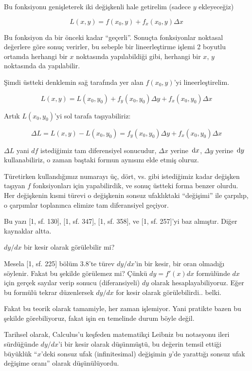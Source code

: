 \documentclass[12pt,fleqn]{article}\usepackage{../../common}
\begin{document}
Bu fonksiyonu genişleterek iki değişkenli hale getirelim (sadece $y$
ekleyeceğiz)

$$ L(x,y) = f(x_0,y) + f_x(x_0,y) \Delta x $$

Bu fonksiyon da bir önceki kadar ``geçerli''. Sonuçta fonksiyonlar
noktasal değerlere göre sonuç verirler, bu sebeple bir lineerleştirme
işlemi 2 boyutlu ortamda herhangi bir $x$ noktasında yapılabildiği
gibi, herhangi bir $x$, $y$ noktasında da yapılabilir.

Şimdi üstteki denklemin sağ tarafında yer alan $f(x_0,y)$'yi lineerleştirelim.  

$$ L(x,y) = L(x_0,y_0) + f_y(x_0,y_0) \Delta y + f_x(x_0,y_0) \Delta x $$

Artık $L(x_0,y_0)$'yi sol tarafa taşıyabiliriz:

$$ \Delta L = L(x,y) - L(x_0,y_0) = f_y(x_0,y_0) \Delta y + f_x(x_0,y_0)
\Delta x $$ 

$\Delta L$ yani $df$ istediğimiz tam diferensiyel sonucudur, $\Delta
x$ yerine $\,\mathrm{d} x$, $\Delta y$ yerine $\,\mathrm{d} y$ kullanabiliriz, o zaman baştaki
formun aynısını elde etmiş oluruz.

Türetirken kullandığımız numarayı üç, dört, vs. gibi istediğimiz kadar
değişken taşıyan $f$ fonksiyonları için yapabilirdik, ve sonuç üstteki
forma benzer olurdu. Her değişkenin kısmi türevi o değişkenin sonsuz
ufaklıktaki ``değişimi'' ile çarpılıp, o çarpımlar toplanınca elimize
tam diferansiyel geçiyor.

Bu yazı [1, sf. 130], [1, sf. 347], [1, sf. 358], ve [1, sf. 257]'yi baz
almıştır. Diğer kaynaklar altta. 

$dy/dx$ bir kesir olarak görülebilir mi? 

Mesela [1, sf. 225] bölüm 3.8'te türev $dy/dx$'in bir kesir, bir oran
olmadığı söylenir. Fakat bu şekilde görülemez mi? Çünkü $dy = f'(x)dx$
formülünde $dx$ için gerçek sayılar verip sonucu (diferansiyeli) $dy$
olarak hesaplayabiliyoruz. Eğer bu formülü tekrar düzenlersek $dy/dx$ for
kesir olarak görülebilirdi.. belki.

Fakat bu teorik olarak tamamiyle, her zaman işlemiyor. Yani pratikte bazen
bu şekilde görebiliyoruz, fakat işin en temelinde durum böyle değil.

Tarihsel olarak, Calculus'u keşfeden matematikçi Leibniz bu notasyonu ileri
sürdüğünde $dy/dx$'i bir kesir olarak düşünmüştü, bu değerin temsil ettiği
büyüklük ``$x$'deki sonsuz ufak (infinitesimal) değişimin $y$'de yarattığı
sonsuz ufak değişime oranı'' olarak düşünülüyordu.
\end{document}
